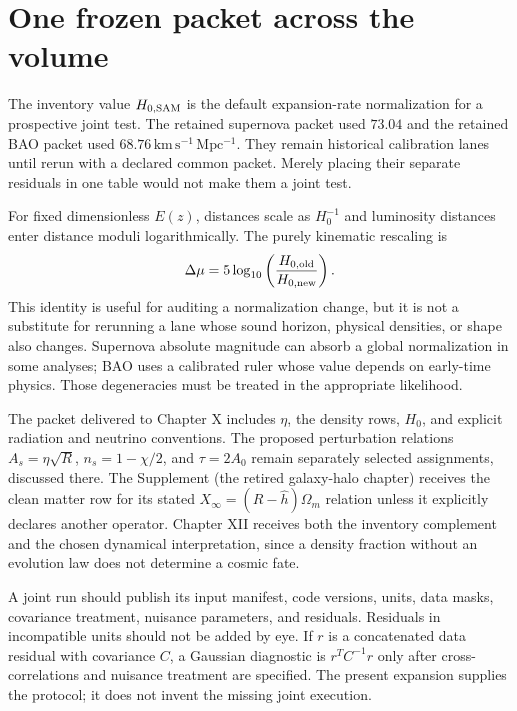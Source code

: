 \section{One frozen packet across the volume}
The inventory value $H_{0,\rm SAM}$ is the default expansion-rate normalization for a prospective joint test. The retained supernova packet used $73.04$ and the retained BAO packet used $68.76\,\mathrm{km\,s^{-1}\,Mpc^{-1}}$. They remain historical calibration lanes until rerun with a declared common packet. Merely placing their separate residuals in one table would not make them a joint test.

For fixed dimensionless $E(z)$, distances scale as $H_0^{-1}$ and luminosity distances enter distance moduli logarithmically. The purely kinematic rescaling is
\begin{equation}
 \Delta\mu=5\log_{10}\left(\frac{H_{0,\rm old}}{H_{0,\rm new}}\right).
 \label{c8:modulus}
\end{equation}
This identity is useful for auditing a normalization change, but it is not a substitute for rerunning a lane whose sound horizon, physical densities, or shape also changes. Supernova absolute magnitude can absorb a global normalization in some analyses; BAO uses a calibrated ruler whose value depends on early-time physics. Those degeneracies must be treated in the appropriate likelihood.

The packet delivered to Chapter X includes $\eta$, the density rows, $H_0$, and explicit radiation and neutrino conventions. The proposed perturbation relations $A_s=\eta\sqrt R$, $n_s=1-\chi/2$, and $\tau=2A_0$ remain separately selected assignments, discussed there. The Supplement (the retired galaxy-halo chapter) receives the clean matter row for its stated $X_\infty=(R-\widehat h)\Omega_m$ relation unless it explicitly declares another operator. Chapter XII receives both the inventory complement and the chosen dynamical interpretation, since a density fraction without an evolution law does not determine a cosmic fate.

A joint run should publish its input manifest, code versions, units, data masks, covariance treatment, nuisance parameters, and residuals. Residuals in incompatible units should not be added by eye. If $r$ is a concatenated data residual with covariance $C$, a Gaussian diagnostic is $r^TC^{-1}r$ only after cross-correlations and nuisance treatment are specified. The present expansion supplies the protocol; it does not invent the missing joint execution.

